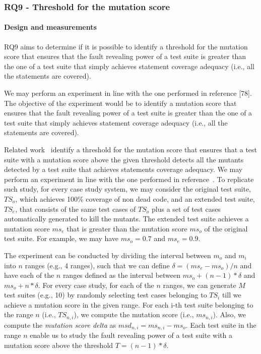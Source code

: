 \subsubsection{RQ9 - Threshold for the mutation score}

\paragraph{Design and measurements}
\label{sec:exp:thr}

RQ9 aims to determine if it is possible to identify a threshold for the mutation score that ensures that the fault revealing power of a test suite is greater than the one of a test suite that simply achieves statement coverage adequacy (i.e., all the statements are covered).


We may perform an experiment in line with the one performed in reference [78]. The objective of the experiment would be to identify a mutation score that ensures that the fault revealing power of a test suite is greater than the one of a test suite that simply achieves statement coverage adequacy (i.e., all the statements are covered). 

Related work~\cite{CChekam:17} identify a threshold for the mutation score that ensures that a test suite with a mutation score above the given threshold detects all the mutants detected by a test suite that achieves statements coverage adequacy. 
We may perform an experiment in line with the one performed in reference~\cite{CChekam:17}.
To replicate such study, for every case study system, we may consider the original test suite, $\mathit{TS}_o$, which achieves 100\% coverage of non dead code, and an extended test suite, $\mathit{TS}_e$, that consists of the same test cases of $\mathit{TS}_o$ plus a set of test cases automatically generated to kill the mutants. The extended test suite achieves a mutation score $ms_e$ that is greater than the mutation score $\mathit{ms}_o$ of the original test suite. For example, we may have $\mathit{ms}_o=0.7$ and $\mathit{ms}_e=0.9$.

The experiment can be conducted by dividing the interval between $m_o$ and $m_i$ into $n$ ranges (e.g., 4 ranges), such that we can define $\delta = (\mathit{ms}_e - \mathit{ms}_o)/n$ and have each of the $n$ ranges defined as the interval between $\mathit{ms}_o+(n-1)*\delta$ and $\mathit{ms}_o+n*\delta$.
For every case study, for each of the $n$ ranges, we can generate $M$ test suites  (e.g., 10) by randomly selecting test cases belonging to $\mathit{TS}_i$ till we achieve a mutation score in the given range.
For each i-th test suite belonging to the range $n$ (i.e., $\mathit{TS}_{n,i}$), we compute the mutation score (i.e., $ms_{n,i}$).
Also, we compute the \emph{mutation score delta} as $msd_{n,i}=ms_{n,i}-ms_o$. Each test suite in the range $n$ enable us to study the fault revealing power of a test suite with a mutation score above the threshold $T=(n-1)*\delta$.

